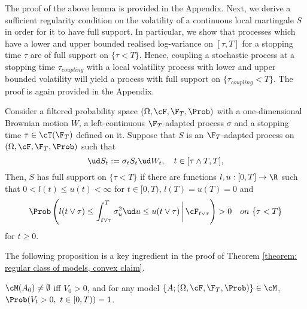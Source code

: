 \documentclass[11pt]{article}
\begin{document}
The proof of the above lemma is provided in the Appendix. Next, we derive a sufficient regularity condition on the volatility of a continuous local martingale $S$ in order for it to have full support. In particular, we show that processes which have a lower and upper bounded realised log-variance on $[\tau, T]$ for a stopping time $\tau$ are of full support on $\{ \tau < T\}$. Hence, coupling a stochastic process at a stopping time $\tau_{coupling}$ with a local volatility process with lower and upper bounded volatility will yield a process with full support on $\{ \tau_{coupling} < T \}$. The proof is again provided in the Appendix.

\begin{proposition}
\label{proposition: (FS) property with bounded realised variance}
Consider a filtered probability space $(\Omega, \cF, \F_T, \Prob)$ with a one-dimensional Brownian motion $W$, a left-continuous $\F_T$-adapted process $\sigma$ and a stopping time $\tau \in \cT(\F_T)$ defined on it. Suppose that $S$ is an $\F_T$-adapted process on $(\Omega, \cF, \F_T, \Prob)$ such that
$$
\ud S_t := \sigma_t S_t \ud W_t, \quad t \in [\tau \wedge T,T],
$$
Then, $S$ has full support on $\{ \tau < T\}$ if there are functions $l, u: [0,T] \to \R$ such that $0 < l(t) \leq u(t) < \infty$ for $t \in [0,T)$, $l(T) = u(T) = 0$ and
\begin{equation}
\label{lower bound for conditional realised variance}
\Prob \left( l(t \vee \tau) \leq \int_{t \vee \tau}^T \sigma^2_u \ud u \leq u(t \vee \tau) \, \bigg{|} \, \cF_{t \vee \tau} \right) > 0 \quad on \ \{ \tau < T \}
\end{equation}
for $t \geq 0$.
\end{proposition}

The following proposition is a key ingredient in the proof of Theorem \ref{theorem: regular class of models, convex claim}. 

\begin{proposition}
\label{proposition: open set for convex claim}
$\cM(A_0) \neq \emptyset$ iff $V_0 > 0$, and for any model $\{A;(\Omega,\cF,\F_T,\Prob) \} \in \cM$, $\Prob(V_t > 0, \ t \in [0,T) ) = 1$.
\end{proposition}
\end{document}
